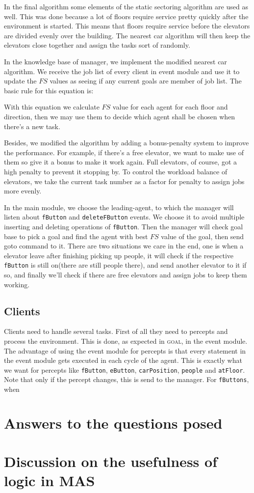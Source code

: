 \documentclass[a4paper,10pt,twocolumn]{article}
\begin{document}
In the final algorithm some elements of the static sectoring algorithm are used as well. This was done because a lot of floors require service pretty quickly after the environment is started. This means that floors require service before the elevators are divided evenly over the building. The nearest car algorithm will then keep the elevators close together and assign the tasks sort of randomly.

In the knowledge base of manager, we implement the modified nearest car algorithm. We receive the job list of every client in event module and use it to update the $FS$ values as seeing if any current goals are member of job list. The basic rule for this equation is:



With this equation we calculate $FS$ value for each agent for each floor and direction, then we may use them to decide which agent shall be chosen when there's a new task.

Besides, we modified the algorithm by adding a bonus-penalty system to improve the performance. For example, if there's a free elevator, we want to make use of them so give it a bonus to make it work again. Full elevators, of course, got a high penalty to prevent it stopping by. To control the workload balance of elevators, we take the current task number as a factor for penalty to assign jobs more evenly.

In the main module, we choose the leading-agent, to which the manager will listen about \texttt{fButton} and \texttt{deleteFButton} events. We choose it to avoid multiple inserting and deleting operations of \texttt{fButton}. Then the manager will check goal base to pick a goal and find the agent with best $FS$ value of the goal, then send goto command to it. There are two situations we care in the end, one is when a elevator leave after finishing picking up people, it will check if the respective \texttt{fButton} is still on(there are still people there), and send another elevator to it if so, and finally we'll check if there are free elevators and assign jobs to keep them working.

\subsection{Clients}
Clients need to handle several tasks. First of all they need to percepts and process the environment. This is done, as expected in \textsc{goal}, in the event module. The advantage of using the event module for percepts is that every statement in the event module gets executed in each cycle of the agent. This is exactly what we want for percepts like \texttt{fButton}, \texttt{eButton}, \texttt{carPosition}, \texttt{people} and \texttt{atFloor}. Note that only if the percept changes, this is send to the manager. For \texttt{fButtons}, when 

\section{Answers to the questions posed}

\section{Discussion on the usefulness of logic in MAS}
\end{document}
